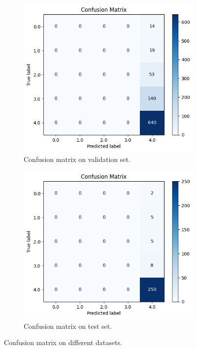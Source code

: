 \documentclass[a4 paper]{article}
\numberwithin{equation}{section}
\newcommand{\0}{\mathbf{0}}
\begin{document}
\begin{center}
    \begin{figure}[H]
        \centering
        \begin{subfigure}[b]{0.49\textwidth}
            \includegraphics[width=\textwidth]{confusion_matrix_val_set}
            \caption{Confusion matrix on validation set.}
            \label{fig:conf_matrix_val}
        \end{subfigure}
        \hfill
        \begin{subfigure}[b]{0.49\textwidth}
            \includegraphics[width=\textwidth]{confusion_matrix_test_set}
            \caption{Confusion matrix on test set.}
            \label{fig:conf_matrix_test}
        \end{subfigure}
        \caption{Confusion matrix on different datasets.}
        \label{fig:confusion_matrix}
    \end{figure}
\end{center}
\end{document}
